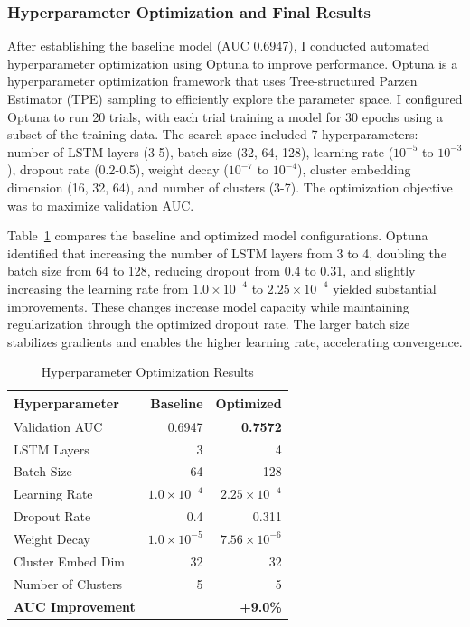 \documentclass[letterpaper]{article} %
\begin{document}
\subsubsection{Hyperparameter Optimization and Final Results}

After establishing the baseline model (AUC 0.6947), I conducted automated hyperparameter optimization using Optuna to improve performance. Optuna is a hyperparameter optimization framework that uses Tree-structured Parzen Estimator (TPE) sampling to efficiently explore the parameter space. I configured Optuna to run 20 trials, with each trial training a model for 30 epochs using a subset of the training data. The search space included 7 hyperparameters: number of LSTM layers (3-5), batch size (32, 64, 128), learning rate ($10^{-5}$ to $10^{-3}$), dropout rate (0.2-0.5), weight decay ($10^{-7}$ to $10^{-4}$), cluster embedding dimension (16, 32, 64), and number of clusters (3-7). The optimization objective was to maximize validation AUC.

Table~\ref{tab:optimization_results} compares the baseline and optimized model configurations. Optuna identified that increasing the number of LSTM layers from 3 to 4, doubling the batch size from 64 to 128, reducing dropout from 0.4 to 0.31, and slightly increasing the learning rate from $1.0 \times 10^{-4}$ to $2.25 \times 10^{-4}$ yielded substantial improvements. These changes increase model capacity while maintaining regularization through the optimized dropout rate. The larger batch size stabilizes gradients and enables the higher learning rate, accelerating convergence.

\begin{table}[h]
\centering
\caption{Hyperparameter Optimization Results}
\label{tab:optimization_results}
\begin{tabular}{@{}lrr@{}}
\toprule
\textbf{Hyperparameter} & \textbf{Baseline} & \textbf{Optimized} \\
\midrule
Validation AUC & 0.6947 & \textbf{0.7572} \\
LSTM Layers & 3 & 4 \\
Batch Size & 64 & 128 \\
Learning Rate & $1.0 \times 10^{-4}$ & $2.25 \times 10^{-4}$ \\
Dropout Rate & 0.4 & 0.311 \\
Weight Decay & $1.0 \times 10^{-5}$ & $7.56 \times 10^{-6}$ \\
Cluster Embed Dim & 32 & 32 \\
Number of Clusters & 5 & 5 \\
\midrule
\textbf{AUC Improvement} & & \textbf{+9.0\%} \\
\bottomrule
\end{tabular}
\end{table}
\end{document}
